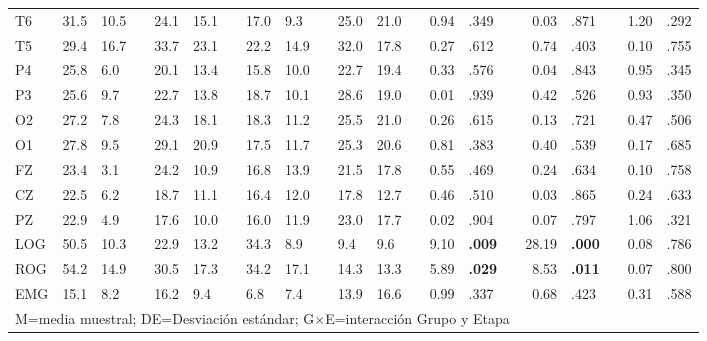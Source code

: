 \documentclass[12pt,letterpaper]{book}
\begin{document}
{\begin{table}
\begin{small}
\begin{tabular}{lllllllllllllrllrllrl}
T6  & 31.5 & 10.5 &  & 24.1 & 15.1 &  & 17.0 & 9.3  &  & 25.0 & 21.0 &  & 0.94 & .349 &  & 0.03  & .871 &  & 1.20 & .292 \\
T5  & 29.4 & 16.7 &  & 33.7 & 23.1 &  & 22.2 & 14.9 &  & 32.0 & 17.8 &  & 0.27 & .612 &  & 0.74  & .403 &  & 0.10 & .755 \\
P4  & 25.8 & 6.0  &  & 20.1 & 13.4 &  & 15.8 & 10.0 &  & 22.7 & 19.4 &  & 0.33 & .576 &  & 0.04  & .843 &  & 0.95 & .345 \\
P3  & 25.6 & 9.7  &  & 22.7 & 13.8 &  & 18.7 & 10.1 &  & 28.6 & 19.0 &  & 0.01 & .939 &  & 0.42  & .526 &  & 0.93 & .350 \\
O2  & 27.2 & 7.8  &  & 24.3 & 18.1 &  & 18.3 & 11.2 &  & 25.5 & 21.0 &  & 0.26 & .615 &  & 0.13  & .721 &  & 0.47 & .506 \\
O1  & 27.8 & 9.5  &  & 29.1 & 20.9 &  & 17.5 & 11.7 &  & 25.3 & 20.6 &  & 0.81 & .383 &  & 0.40  & .539 &  & 0.17 & .685 \\
FZ  & 23.4 & 3.1  &  & 24.2 & 10.9 &  & 16.8 & 13.9 &  & 21.5 & 17.8 &  & 0.55 & .469 &  & 0.24  & .634 &  & 0.10 & .758 \\
CZ  & 22.5 & 6.2  &  & 18.7 & 11.1 &  & 16.4 & 12.0 &  & 17.8 & 12.7 &  & 0.46 & .510 &  & 0.03  & .865 &  & 0.24 & .633 \\
PZ  & 22.9 & 4.9  &  & 17.6 & 10.0 &  & 16.0 & 11.9 &  & 23.0 & 17.7 &  & 0.02 & .904 &  & 0.07  & .797 &  & 1.06 & .321 \\
LOG & 50.5 & 10.3 &  & 22.9 & 13.2 &  & 34.3 & 8.9  &  & 9.4  & 9.6  &  & 9.10 &\bf .009 &  & 28.19 &\bf .000 &  & 0.08 & .786 \\
ROG & 54.2 & 14.9 &  & 30.5 & 17.3 &  & 34.2 & 17.1 &  & 14.3 & 13.3 &  & 5.89 &\bf .029 &  & 8.53  &\bf .011 &  & 0.07 & .800 \\
EMG & 15.1 & 8.2  &  & 16.2 & 9.4  &  & 6.8  & 7.4  &  & 13.9 & 16.6 &  & 0.99 & .337 &  & 0.68  & .423 &  & 0.31 & .588 \\
\bottomrule 
\multicolumn{20}{l}{M=media muestral; DE=Desviación estándar; G$\times$E=interacción Grupo y Etapa}
\end{tabular}
\end{small}
\end{table}
}
\end{document}
